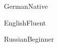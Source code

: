 \documentclass[a4paper,10pt]{cv}
\begin{document}
\begin{multicols}{2}
      \end{multicols}
      \vspace{-1.2em}
      \begin{multicols}{3}
        \begin{cvShortSkillItem}{German}{Native}
        \end{cvShortSkillItem}
        \begin{cvShortSkillItem}{English}{Fluent}
        \end{cvShortSkillItem}
        \begin{cvShortSkillItem}{Russian}{Beginner}
        \end{cvShortSkillItem}
      \end{multicols}
\end{document}
